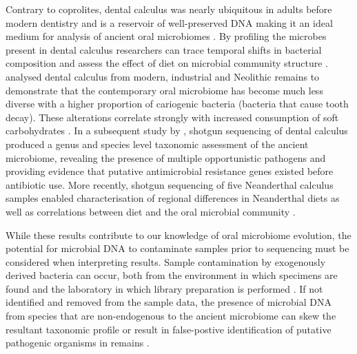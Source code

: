 \documentclass[12pt, a4paper]{article}
\begin{document}
Contrary to coprolites, dental calculus was nearly ubiquitous in adults before modern dentistry \cite{White:1997} and is a reservoir of well-preserved DNA making it an ideal medium for analysis of ancient oral microbiomes \cite{Warinner:2014aa,Weyrich:2015aa}. 
By profiling the microbes present in dental calculus researchers can trace temporal shifts in bacterial composition and assess the effect of diet on microbial community structure \cite{Weyrich:2015aa}.
 analysed dental calculus from modern, industrial and Neolithic remains to demonstrate that the contemporary oral microbiome has become much less diverse with a higher proportion of cariogenic bacteria (bacteria that cause tooth decay). 
These alterations correlate strongly with increased consumption of soft carbohydrates \cite{Adler:2013aa}.
In a subsequent study by , shotgun sequencing of dental calculus produced a genus and species level taxonomic assessment of the ancient microbiome, revealing the presence of multiple opportunistic pathogens and providing evidence that putative antimicrobial resistance genes existed before antibiotic use. 
More recently, shotgun sequencing of five Neanderthal calculus samples enabled characterisation of regional differences in Neanderthal diets as well as correlations between diet and the oral microbial community \cite{Weyrich:2017aa}.

While these results contribute to our knowledge of oral microbiome evolution, the potential for microbial DNA to contaminate samples prior to sequencing must be considered when interpreting results. Sample contamination by exogenously derived bacteria can occur, both from the environment in which specimens are found and the laboratory in which library preparation is performed \cite{Cooper:2000aa,Handt:1994aa}. If not identified and removed from the sample data, the presence of microbial DNA from species that are non-endogenous to the ancient microbiome can skew the resultant taxonomic profile \cite{Ziesemer:2015aa} or result in false-postive identification of putative pathogenic organisms in remains \cite{Gilbert:2004aa, Shapiro:2006aa}. 
\end{document}
